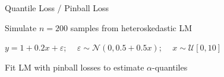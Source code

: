 \documentclass[11pt,compress,t,notes=noshow, xcolor=table]{beamer}
\begin{document}
\begin{framei}[sep=M]{Quantile Loss / Pinball Loss}

\item Simulate $n=200$ samples from heteroskedastic LM 
\item $y = 1+0.2x+\varepsilon$; 
$\quad \varepsilon \sim \mathcal{N}(0, 0.5+0.5x)$; $\quad x \sim \mathcal{U}[0,10]$
\item Fit LM with pinball losses to estimate $\alpha$-quantiles 



\end{framei}


\endlecture
\end{document}
